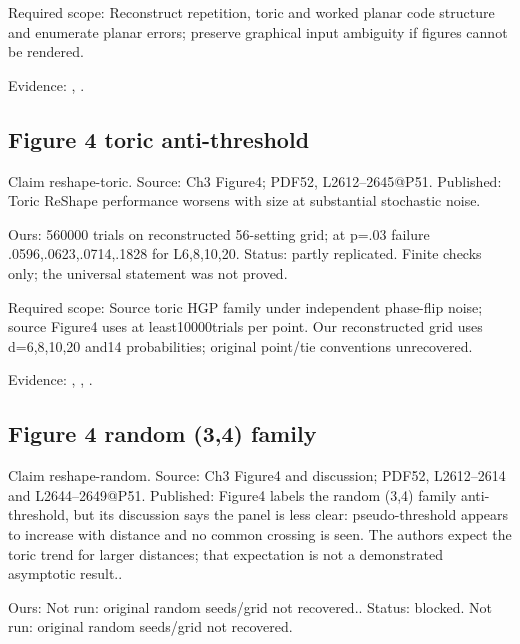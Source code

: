 Required scope: Reconstruct repetition, toric and worked planar code structure and enumerate planar errors; preserve graphical input ambiguity if figures cannot be rendered.

Evidence: \href{https://github.com/alectionary/vibe-math/blob/master/formalization/quintavalle-hgp/sources/browser-extraction.txt}{}, \href{https://github.com/alectionary/vibe-math/blob/master/formalization/quintavalle-hgp/availability.md}{}.
\subsection{Figure 4 toric anti-threshold}\label{claim:reshape-toric}
Claim reshape-toric. Source: Ch3 Figure4; PDF52, L2612--2645@P51. Published: Toric ReShape performance worsens with size at substantial stochastic noise.

Ours: 560000 trials on reconstructed 56-setting grid; at p=.03 failure .0596,.0623,.0714,.1828 for L6,8,10,20. Status: partly replicated. Finite checks only; the universal statement was not proved.

Required scope: Source toric HGP family under independent phase-flip noise; source Figure4 uses at least10000trials per point. Our reconstructed grid uses d=6,8,10,20 and14 probabilities; original point/tie conventions unrecovered.

Evidence: \href{https://github.com/alectionary/vibe-math/blob/master/formalization/quintavalle-hgp/sources/browser-extraction.txt}{}, \href{https://github.com/alectionary/vibe-math/blob/master/formalization/quintavalle-hgp/availability.md}{}, \href{https://github.com/alectionary/vibe-math/blob/master/formalization/quintavalle-hgp/results/toric_noise.json}{}.
\subsection{Figure 4 random (3,4) family}\label{claim:reshape-random}
Claim reshape-random. Source: Ch3 Figure4 and discussion; PDF52, L2612--2614 and L2644--2649@P51. Published: Figure4 labels the random (3,4) family anti-threshold, but its discussion says the panel is less clear: pseudo-threshold appears to increase with distance and no common crossing is seen. The authors expect the toric trend for larger distances; that expectation is not a demonstrated asymptotic result..

Ours: Not run: original random seeds/grid not recovered.. Status: blocked. Not run: original random seeds/grid not recovered.


